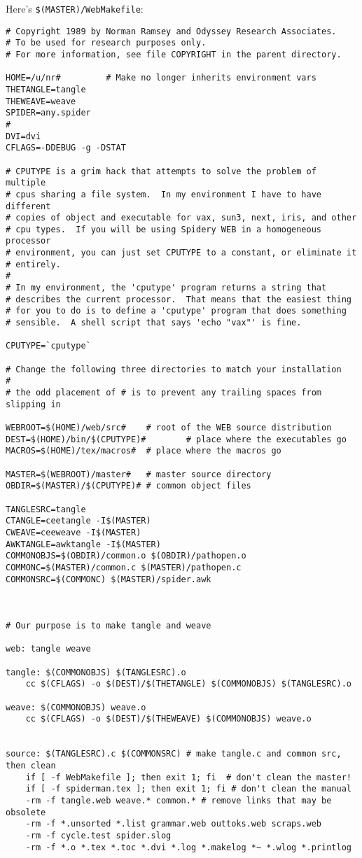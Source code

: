 Here's \verb+$(MASTER)/WebMakefile+:
\begingroup\small
\begin{verbatim}
# Copyright 1989 by Norman Ramsey and Odyssey Research Associates.
# To be used for research purposes only.
# For more information, see file COPYRIGHT in the parent directory.

HOME=/u/nr#			# Make no longer inherits environment vars
THETANGLE=tangle
THEWEAVE=weave
SPIDER=any.spider
#
DVI=dvi
CFLAGS=-DDEBUG -g -DSTAT

# CPUTYPE is a grim hack that attempts to solve the problem of multiple
# cpus sharing a file system.  In my environment I have to have different
# copies of object and executable for vax, sun3, next, iris, and other 
# cpu types.  If you will be using Spidery WEB in a homogeneous processor
# environment, you can just set CPUTYPE to a constant, or eliminate it 
# entirely.  
#
# In my environment, the 'cputype' program returns a string that
# describes the current processor.  That means that the easiest thing
# for you to do is to define a 'cputype' program that does something
# sensible.  A shell script that says 'echo "vax"' is fine.

CPUTYPE=`cputype`

# Change the following three directories to match your installation
#
# the odd placement of # is to prevent any trailing spaces from slipping in

WEBROOT=$(HOME)/web/src# 	# root of the WEB source distribution
DEST=$(HOME)/bin/$(CPUTYPE)#	 	# place where the executables go
MACROS=$(HOME)/tex/macros# 	# place where the macros go

MASTER=$(WEBROOT)/master# 	# master source directory
OBDIR=$(MASTER)/$(CPUTYPE)#	# common object files

TANGLESRC=tangle
CTANGLE=ceetangle -I$(MASTER)
CWEAVE=ceeweave -I$(MASTER)
AWKTANGLE=awktangle -I$(MASTER)
COMMONOBJS=$(OBDIR)/common.o $(OBDIR)/pathopen.o
COMMONC=$(MASTER)/common.c $(MASTER)/pathopen.c
COMMONSRC=$(COMMONC) $(MASTER)/spider.awk



# Our purpose is to make tangle and weave

web: tangle weave

tangle: $(COMMONOBJS) $(TANGLESRC).o
	cc $(CFLAGS) -o $(DEST)/$(THETANGLE) $(COMMONOBJS) $(TANGLESRC).o

weave: $(COMMONOBJS) weave.o
	cc $(CFLAGS) -o $(DEST)/$(THEWEAVE) $(COMMONOBJS) weave.o


source: $(TANGLESRC).c $(COMMONSRC) # make tangle.c and common src, then clean
	if [ -f WebMakefile ]; then exit 1; fi  # don't clean the master!
	if [ -f spiderman.tex ]; then exit 1; fi # don't clean the manual
	-rm -f tangle.web weave.* common.* # remove links that may be obsolete
	-rm -f *.unsorted *.list grammar.web outtoks.web scraps.web 
	-rm -f cycle.test spider.slog
	-rm -f *.o *.tex *.toc *.dvi *.log *.makelog *~ *.wlog *.printlog


\end{verbatim}
